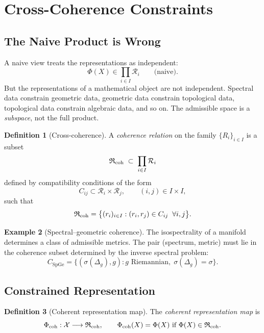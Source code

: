 \documentclass[11pt,a4paper]{article}
\theoremstyle{definition}
\newtheorem{definition}{Definition}[section]
\newtheorem{example}[definition]{Example}
\theoremstyle{plain}
\newcommand{\Sp}{\mathrm{Sp}}
\newcommand{\Ge}{\mathrm{Ge}}
\newcommand{\Rcal}{\mathcal{R}}
\newcommand{\Xcal}{\mathcal{X}}
\newcommand{\Rfrak}{\mathfrak{R}}
\newcommand{\Phimap}{\Phi}
\newcommand{\spec}{\sigma}
\begin{document}
\section{Cross-Coherence Constraints}
\label{sec:coherence}

\subsection{The Naive Product is Wrong}

A naive view treats the representations as independent:
\[
  \Phimap(X) \in \prod_{i \in I} \Rcal_i
  \qquad \text{(naive)}.
\]
But the representations of a mathematical object are not
independent. Spectral data constrain geometric data, geometric data
constrain topological data, topological data constrain algebraic
data, and so on. The admissible space is a \emph{subspace}, not the
full product.

\begin{definition}[Cross-coherence]\label{def:cross-coherence}
A \emph{coherence relation} on the family $\{R_i\}_{i \in I}$ is a
subset
\[
  \Rfrak_{\rm coh} \;\subset\; \prod_{i \in I} \Rcal_i
\]
defined by compatibility conditions of the form
\[
  C_{ij} \subset \Rcal_i \times \Rcal_j,
  \qquad (i, j) \in I \times I,
\]
such that
\[
  \Rfrak_{\rm coh}
  =
  \bigl\{ (r_i)_{i \in I} : (r_i, r_j) \in C_{ij} \;\;
  \forall i, j \bigr\}.
\]
\end{definition}

\begin{example}[Spectral--geometric coherence]
The isospectrality of a manifold determines a class of admissible
metrics. The pair (spectrum, metric) must lie in the coherence
subset determined by the inverse spectral problem:
\[
  C_{\Sp\Ge} = \{(\spec(\Delta_g), g) : g \text{ Riemannian}, \;
  \spec(\Delta_g) = \spec\}.
\]
\end{example}

\subsection{Constrained Representation}

\begin{definition}[Coherent representation map]\label{def:coherent-map}
The \emph{coherent representation map} is
\[
  \Phimap_{\rm coh} : \Xcal \longrightarrow \Rfrak_{\rm coh},
  \qquad
  \Phimap_{\rm coh}(X) = \Phimap(X) \text{ if } \Phimap(X) \in \Rfrak_{\rm coh}.
\]
\end{definition}
\end{document}
